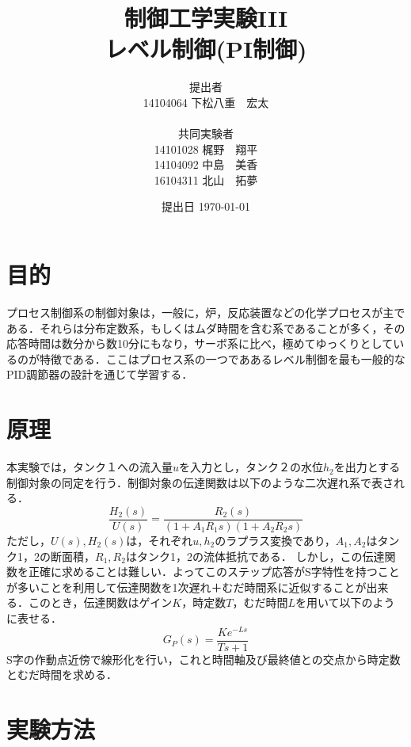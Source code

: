 \documentclass[11pt,a4paper]{jsarticle}
\begin{document}
\title{制御工学実験I\hspace{-0.1mm}I\hspace{-0.1mm}I\\ レベル制御(PI制御)}
\author{提出者 \\ 14104064 下松八重　宏太 \\ \\ 共同実験者 \\ 14101028 梶野　翔平 \\ 14104092 中島　美香 \\ 16104311 北山　拓夢}
\date{提出日 \today}



\maketitle
\thispagestyle{empty}
\newpage


\section{目的}
プロセス制御系の制御対象は，一般に，炉，反応装置などの化学プロセスが主である．それらは分布定数系，もしくはムダ時間を含む系であることが多く，その応答時間は数分から数10分にもなり，サーボ系に比べ，極めてゆっくりとしているのが特徴である．ここはプロセス系の一つでああるレベル制御を最も一般的なPID調節器の設計を通じて学習する．
\section{原理}
本実験では，タンク１への流入量$u$を入力とし，タンク２の水位$h_2$を出力とする制御対象の同定を行う．制御対象の伝達関数は以下のような二次遅れ系で表される．
\begin{equation}
 \frac{H_2(s)}{U(s)} = \frac{R_2(s)}{(1+A_1 R_1 s)(1+A_2 R_2 s)}
\end{equation}
ただし，$U(s),H_2(s)$は，それぞれ$u,h_2$のラプラス変換であり，$A_1,A_2$はタンク1，2の断面積，$R_1,R_2$はタンク1，2の流体抵抗である．
しかし，この伝達関数を正確に求めることは難しい．よってこのステップ応答がS字特性を持つことが多いことを利用して伝達関数を1次遅れ＋むだ時間系に近似することが出来る．このとき，伝達関数はゲイン$K$，時定数$T$，むだ時間$L$を用いて以下のように表せる．
\begin{equation}
 G_P(s) = \frac{K e^{-Ls}}{Ts+1} 
\end{equation}
S字の作動点近傍で線形化を行い，これと時間軸及び最終値との交点から時定数とむだ時間を求める．
\section{実験方法}
\end{document}
